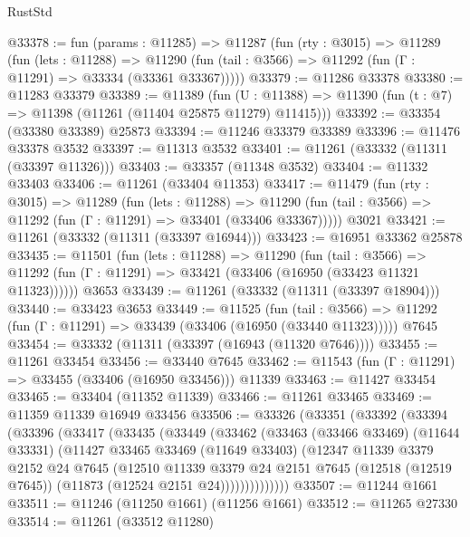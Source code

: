 \begin{lexlean}{RustStd}
\begin{coremodule}
@33378 := fun (params : @11285) =>
  @11287
    (fun (rty : @3015) =>
    @11289
      (fun (lets : @11288) =>
      @11290 (fun (tail : @3566) => @11292 (fun (Γ : @11291) => @33334 (@33361 @33367)))))
@33379 := @11286 @33378
@33380 := @11283 @33379
@33389 := @11389
    (fun (U : @11388) => @11390 (fun (t : @7) => @11398 (@11261 (@11404 @25875 @11279) @11415)))
@33392 := @33354 (@33380 @33389) @25873
@33394 := @11246 @33379 @33389
@33396 := @11476 @33378 @3532
@33397 := @11313 @3532
@33401 := @11261 (@33332 (@11311 (@33397 @11326)))
@33403 := @33357 (@11348 @3532)
@33404 := @11332 @33403
@33406 := @11261 (@33404 @11353)
@33417 := @11479
    (fun (rty : @3015) =>
    @11289
      (fun (lets : @11288) =>
      @11290 (fun (tail : @3566) => @11292 (fun (Γ : @11291) => @33401 (@33406 @33367)))))
    @3021
@33421 := @11261 (@33332 (@11311 (@33397 @16944)))
@33423 := @16951 @33362 @25878
@33435 := @11501
    (fun (lets : @11288) =>
    @11290
      (fun (tail : @3566) =>
      @11292 (fun (Γ : @11291) => @33421 (@33406 (@16950 (@33423 @11321 @11323))))))
    @3653
@33439 := @11261 (@33332 (@11311 (@33397 @18904)))
@33440 := @33423 @3653
@33449 := @11525
    (fun (tail : @3566) => @11292 (fun (Γ : @11291) => @33439 (@33406 (@16950 (@33440 @11323)))))
    @7645
@33454 := @33332 (@11311 (@33397 (@16943 (@11320 @7646))))
@33455 := @11261 @33454
@33456 := @33440 @7645
@33462 := @11543 (fun (Γ : @11291) => @33455 (@33406 (@16950 @33456))) @11339
@33463 := @11427 @33454
@33465 := @33404 (@11352 @11339)
@33466 := @11261 @33465
@33469 := @11359 @11339 @16949 @33456
@33506 := @33326
    (@33351
      (@33392
        (@33394
          (@33396
            (@33417
              (@33435
                (@33449
                  (@33462
                    (@33463
                      (@33466 @33469)
                      (@11644 @33331)
                      (@11427
                        @33465
                        @33469
                        (@11649 @33403)
                        (@12347
                          @11339
                          @3379
                          @2152
                          @24
                          @7645
                          (@12510
                            @11339
                            @3379
                            @24
                            @2151
                            @7645
                            (@12518 (@12519 @7645))
                            (@11873 (@12524 @2151 @24))))))))))))))
@33507 := @11244 @1661
@33511 := @11246 (@11250 @1661) (@11256 @1661)
@33512 := @11265 @27330
@33514 := @11261 (@33512 @11280)

\end{coremodule}
\end{lexlean}
